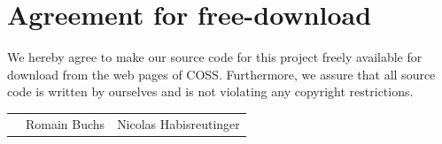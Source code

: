 \documentclass[11pt]{article}
\begin{document}

\newpage


\newpage
{}
\section*{Agreement for free-download}
\bigskip


\bigskip


\large We hereby agree to make our source code for this project freely available for download from the web pages of COSS. Furthermore, we assure that all source code is written by ourselves and is not violating any copyright restrictions.

\begin{center}

\bigskip


\bigskip


\begin{tabular}{@{}p{3.3cm}@{}p{6cm}@{}@{}p{6cm}@{}}
\begin{minipage}{3cm}

\end{minipage}
&
\begin{minipage}{6cm}
\vspace{2mm} \large Romain Buchs

 \vspace{\baselineskip}

\end{minipage}
&
\begin{minipage}{6cm}

\large Nicolas Habisreutinger

\end{minipage}
\end{tabular}


\end{center}
\newpage







\tableofcontents

\newpage

\end{document}

